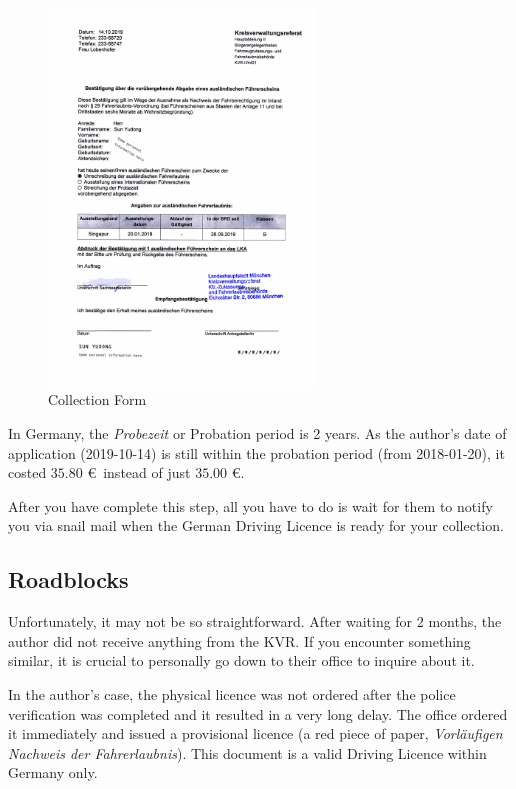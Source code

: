 \documentclass{article}
\newcommand{\de}[1]{\textcolor{NavyBlue}{\textit{#1}}}
\begin{document}
        \begin{figure}[H]
            \centering
            \includegraphics[width=0.63\textwidth]{collection.pdf}
            \caption{Collection Form}
            \label{fig:collection}
        \end{figure}
        
        In Germany, the \de{Probezeit} or Probation period is 2 years. As the author's date of application (2019-10-14) is still within the probation period (from 2018-01-20), it costed $35.80$ \euro~instead of just $35.00$ \euro.
        
        After you have complete this step, all you have to do is wait for them to notify you via snail mail when the German Driving Licence is ready for your collection.
    
    \subsection{Roadblocks} \label{subsec:roadblocks}
        Unfortunately, it may not be so straightforward. After waiting for 2 months, the author did not receive anything from the KVR. If you encounter something similar, it is crucial to personally go down to their office to inquire about it. 
        
        In the author's case, the physical licence was not ordered after the police verification was completed and it resulted in a very long delay. The office ordered it immediately and issued a provisional licence (a red piece of paper, \de{Vorläufigen Nachweis der Fahrerlaubnis}). This document is a valid Driving Licence within Germany only. 
        
\end{document}
